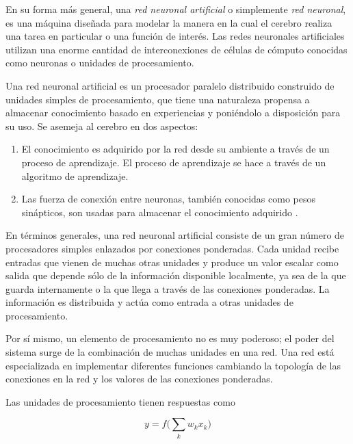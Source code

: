 En su forma más general, una \textit{red neuronal artificial} 
o simplemente \textit{red neuronal}, es una máquina diseñada para modelar la manera en la cual el cerebro 
realiza una tarea en particular o una función de interés. Las redes neuronales 
artificiales utilizan
una enorme cantidad de interconexiones de células de cómputo conocidas como neuronas o unidades de procesamiento.\\


\begin{remark}
Una red neuronal artificial es un procesador paralelo distribuido construido de unidades simples de
procesamiento, que tiene una naturaleza propensa a almacenar
conocimiento basado en experiencias y poniéndolo a disposición para su uso. Se 
asemeja al cerebro en dos aspectos:
\begin{enumerate}
    \item El conocimiento es adquirido por la red desde su ambiente a través de un proceso de aprendizaje. El proceso de aprendizaje se hace a través de un algoritmo de aprendizaje.
    \item Las fuerza de conexión entre neuronas, también conocidas como pesos sinápticos, son usadas para almacenar el conocimiento adquirido \cite{johnahertzandersskroghrichardgpalmer1991}.
\end{enumerate}

\end{remark}

En términos generales, una red neuronal artificial consiste de un gran número 
de procesadores simples enlazados por conexiones ponderadas.
Cada unidad recibe entradas que vienen de muchas otras unidades y 
produce un valor escalar como salida que depende sólo de la información
disponible localmente, ya sea de la que guarda internamente o la que llega
a través de las conexiones ponderadas. La información es distribuida 
y actúa como entrada a otras unidades de procesamiento.

Por sí mismo, un elemento de procesamiento no es muy poderoso; el poder
del sistema surge de la combinación de muchas unidades en una red.
Una red está especializada en implementar diferentes funciones cambiando la 
topología de las conexiones en la red y los valores de las
conexiones ponderadas.

Las unidades de procesamiento tienen respuestas como

\begin{equation}\label{eq:neuron-output}
y = f\bigg (\sum_k w_k x_k\bigg )    
\end{equation}

